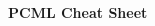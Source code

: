 \documentclass[10pt,a4paper,landscape]{article}
\begin{document}
\raggedright
\footnotesize
\begin{multicols*}{2}

\setlength{\columnseprule}{0.25pt}
\setlength{\premulticols}{1pt}
\setlength{\postmulticols}{1pt}
\setlength{\multicolsep}{1pt}
\setlength{\columnsep}{2pt}

\begin{center}
     \large{\textbf{PCML Cheat Sheet}} \\
\end{center}



\end{multicols*}
\end{document}
